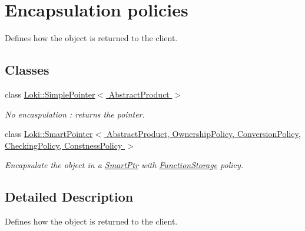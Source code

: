 \hypertarget{group__EncapsulationPolicyCachedFactoryGroup}{}\section{Encapsulation policies}
\label{group__EncapsulationPolicyCachedFactoryGroup}


Defines how the object is returned to the client.  


\subsection*{Classes}
\begin{DoxyCompactItemize}
\item 
class \hyperlink{classLoki_1_1SimplePointer}{Loki\+::\+Simple\+Pointer$<$ Abstract\+Product $>$}
\begin{DoxyCompactList}\small\item\em No encaspulation \+: returns the pointer. \end{DoxyCompactList}\item 
class \hyperlink{classLoki_1_1SmartPointer}{Loki\+::\+Smart\+Pointer$<$ Abstract\+Product, Ownership\+Policy, Conversion\+Policy, Checking\+Policy, Constness\+Policy $>$}
\begin{DoxyCompactList}\small\item\em Encapsulate the object in a \hyperlink{classLoki_1_1SmartPtr}{Smart\+Ptr} with \hyperlink{classLoki_1_1FunctionStorage}{Function\+Storage} policy. \end{DoxyCompactList}\end{DoxyCompactItemize}


\subsection{Detailed Description}
Defines how the object is returned to the client. 

